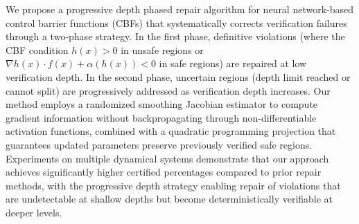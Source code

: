 We propose a progressive depth phased repair algorithm for neural network-based control barrier functions (CBFs) that systematically corrects verification failures through a two-phase strategy. In the first phase, definitive violations (where the CBF condition $h(x) > 0$ in unsafe regions or $\nabla h(x) \cdot f(x) + \alpha(h(x)) < 0$ in safe regions) are repaired at low verification depth. In the second phase, uncertain regions (depth limit reached or cannot split) are progressively addressed as verification depth increases. Our method employs a randomized smoothing Jacobian estimator to compute gradient information without backpropagating through non-differentiable activation functions, combined with a quadratic programming projection that guarantees updated parameters preserve previously verified safe regions. Experiments on multiple dynamical systems demonstrate that our approach achieves significantly higher certified percentages compared to prior repair methods, with the progressive depth strategy enabling repair of violations that are undetectable at shallow depths but become deterministically verifiable at deeper levels.